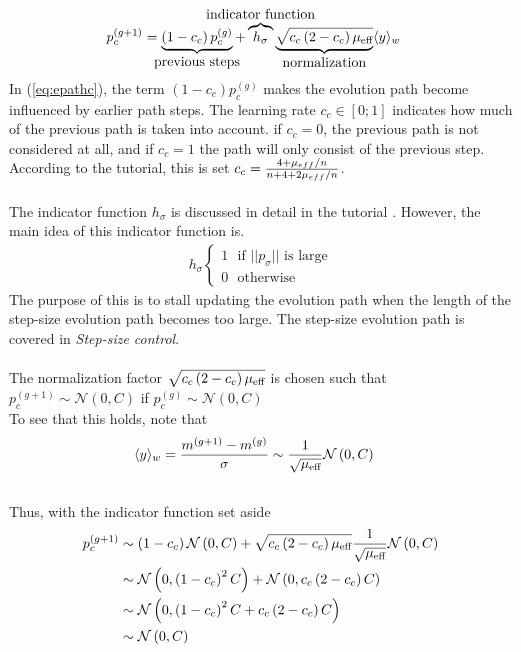 \begin{align}
p_{c}^{(g+1)} &= \underbrace{\left( 1 - c_{c} \right) 
p_{c}^{(g)}}_{\makebox[0pt]{\text{previous steps}}}  + 
\overbrace{h_{\sigma}}^{\makebox[0pt]{\text{{indicator function}}}}
\underbrace{\sqrt{c_{c} \left( 2 - c_{c} \right) \offspringNumber_{\text{eff}}}}_{
\makebox[0pt]{\text{normalization}}
}
\langle y \rangle_{w} \label{eq:epathc}
\end{align}
In (\ref{eq:epathc}), the term $\left( 1 - c_{c} \right) p_{c}^{(g)}$ makes 
the evolution path become influenced by earlier path steps. The learning rate
$c_c \in [0;1] $ indicates how much of the previous path is taken into account.
if $c_c = 0$, the previous path is not considered at all, and if $c_c = 1$ the path 
will only consist of the previous step. According to the tutorial, this is set
$c_c = \frac{4 + \mu_{eff} / n}{n + 4 + 2 \mu_{eff} / n}$.\\
\\
The indicator function $h_{\sigma}$ is discussed in detail in the tutorial \citep{hansen2011}.
However, the main idea of this indicator function is.
\begin{align}
h_{\sigma}
\begin{cases} 1\ \ \ \text{if $||p_{\sigma}||$ is large} \\
              0\ \ \ \text{otherwise} %
\end{cases}
\end{align}
The purpose of this is to stall updating the evolution path when 
the length of the step-size evolution path becomes too large. The step-size
evolution path is covered in \textit{Step-size control}.\\
\\
The normalization factor 
$\sqrt{c_{c} \left( 2 - c_{c} \right) \mu_{\text{eff}}}$ is chosen such that
$p^{(g+1)}_{c} \sim \mathcal{N}\left(0, C \right)$ if $p_c^{(g)} \sim \mathcal{N} 
\left(0, C\right)$\\
To see that this holds, note that
\begin{align}
\langle y \rangle_{w} &= \frac{m^{(g+1)} - m^{(g)}}{\sigma}
\sim \frac{1}{\sqrt{\mu_{\text{eff}}}}  \mathcal{N}\left(0, C \right)
\end{align}
\\
Thus, with the indicator function set aside
\begin{align}
p_{c}^{(g+1)} &\sim \left( 1 - c_{c} \right) 
\mathcal{N}\left(0, C \right) + 
\sqrt{c_{c} \left( 2 - c_{c} \right) \mu_{\text{eff}}}
\frac{1}{\sqrt{\mu_{\text{eff}}}}\mathcal{N}\left(0, C \right) \label{eq:nomalization_start}\\
&\sim
\mathcal{N}\left(0, \left( 1 - c_{c} \right)^2 C \right) + 
\mathcal{N}\left(0, c_{c} \left( 2 - c_{c} \right)  C \right)\\
&\sim
\mathcal{N}\left(0, \left( 1 - c_{c} \right)^2 C + c_{c} \left( 2 - c_{c} \right)  C  \right)\\
&\sim \mathcal{N}\left( 0, C \right) \label{eq:nomalization_end}
\end{align}
